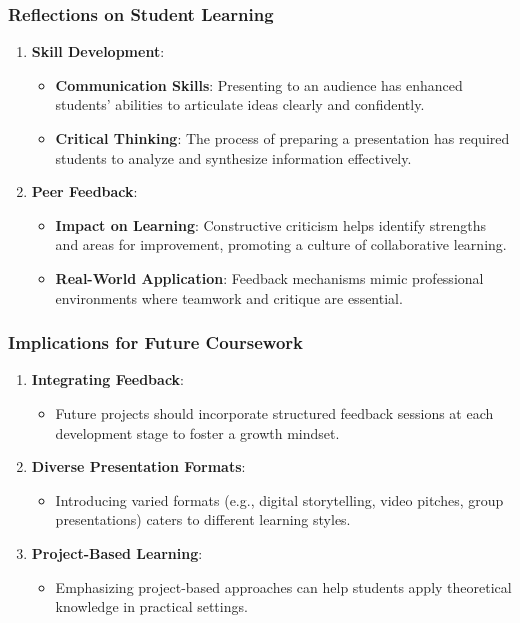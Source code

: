 \documentclass{beamer}
\begin{document}
\begin{frame}[fragile]
    \frametitle{Reflections on Student Learning}
    \begin{enumerate}
        \item \textbf{Skill Development}:
        \begin{itemize}
            \item \textbf{Communication Skills}: Presenting to an audience has enhanced students' abilities to articulate ideas clearly and confidently.
            \item \textbf{Critical Thinking}: The process of preparing a presentation has required students to analyze and synthesize information effectively.
        \end{itemize}
        \item \textbf{Peer Feedback}:
        \begin{itemize}
            \item \textbf{Impact on Learning}: Constructive criticism helps identify strengths and areas for improvement, promoting a culture of collaborative learning.
            \item \textbf{Real-World Application}: Feedback mechanisms mimic professional environments where teamwork and critique are essential.
        \end{itemize}
    \end{enumerate}
\end{frame}

\begin{frame}[fragile]
    \frametitle{Implications for Future Coursework}
    \begin{enumerate}
        \item \textbf{Integrating Feedback}:
        \begin{itemize}
            \item Future projects should incorporate structured feedback sessions at each development stage to foster a growth mindset.
        \end{itemize}
        \item \textbf{Diverse Presentation Formats}:
        \begin{itemize}
            \item Introducing varied formats (e.g., digital storytelling, video pitches, group presentations) caters to different learning styles.
        \end{itemize}
        \item \textbf{Project-Based Learning}:
        \begin{itemize}
            \item Emphasizing project-based approaches can help students apply theoretical knowledge in practical settings.
        \end{itemize}
    \end{enumerate}
\end{frame}
\end{document}
